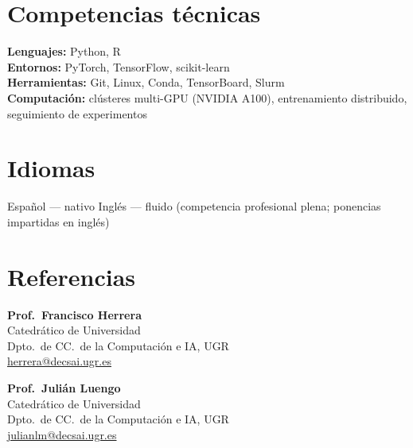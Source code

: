 \documentclass[10pt,a4paper]{article}
\newcommand{\blueitem}[1]{\textcolor{subtitleblue}{\textbf{#1}}}
\newcommand{\sub}[1]{\textcolor{subtle}{\footnotesize #1}}
\begin{document}
\section*{Competencias técnicas}

\blueitem{Lenguajes:} Python, R \\
\blueitem{Entornos:} PyTorch, TensorFlow, scikit-learn \\
\blueitem{Herramientas:} Git, Linux, Conda, TensorBoard, Slurm \\
\blueitem{Computación:} clústeres multi-GPU (NVIDIA A100), entrenamiento distribuido, seguimiento de experimentos

\section*{Idiomas}

Español --- nativo \quad\textbar\quad Inglés --- fluido (competencia profesional plena; ponencias impartidas en inglés)

\section*{Referencias}

\begin{minipage}[t]{0.48\textwidth}
    \textbf{Prof.~Francisco Herrera} \\
    \sub{Catedrático de Universidad \\ Dpto.~de CC.~de la Computación e IA, UGR \\ \href{mailto:herrera@decsai.ugr.es}{herrera@decsai.ugr.es}}
\end{minipage}\hfill
\begin{minipage}[t]{0.48\textwidth}
    \textbf{Prof.~Julián Luengo} \\
    \sub{Catedrático de Universidad \\ Dpto.~de CC.~de la Computación e IA, UGR \\ \href{mailto:julianlm@decsai.ugr.es}{julianlm@decsai.ugr.es}}
\end{minipage}
\end{document}
